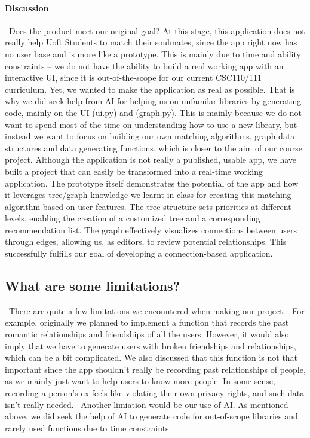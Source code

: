 \documentclass[fontsize=11pt]{article}
\begin{document}
\paragraph{Discussion}
\ Does the product meet our original goal?
At this stage, this application does not really help Uoft Students to match their soulmates, since the app right now has no user base and is more like a prototype.
This is mainly due to time and ability constraints -- we do not have the ability to build a real working app with an interactive UI, since it is out-of-the-scope for our current CSC110/111 curriculum. Yet, we wanted to make the application as real as possible. That is why we did seek help from AI for helping us on unfamilar libraries by generating code, mainly on the UI (ui.py) and (graph.py). This is mainly because we do not want to spend most of the time on understanding how to use a new library, but instead we want to focus on building our own matching algorithms, graph data structures and data generating functions, which is closer to the aim of our course project.
Although the application is not really a published, usable app, we have built a project that can easily be transformed into a real-time working application. The prototype itself demonstrates the potential of the app and how it leverages tree/graph knowledge we learnt in class for creating this matching algorithm based on user features. The tree structure sets priorities at different levels, enabling the creation of a customized tree and a corresponding recommendation list. The graph effectively visualizes connections between users through edges, allowing us, as editors, to review potential relationships. 
This successfully fulfills our goal of developing a connection-based application.

\subsection{What are some limitations?} 
\ There are quite a few limitations we encountered when making our project. 
\ For example, originally we planned to implement a function that records the past romantic relationships and friendships of all the users. However, it would also imply that we have to generate users with broken friendships and relationships, which can be a bit complicated. We also discussed that this function is not that important since the app shouldn't really be recording past relationships of people, as we mainly just want to help users to know more people. In some sense, recording a person's ex feels like violating their own privacy rights, and such data isn't really needed.  
\ Another limiation would be our use of AI. As mentioned above, we did seek the help of AI to generate code for out-of-scope libraries and rarely used functions due to time constraints. 
\ 
\end{document}
